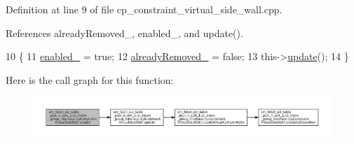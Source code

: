 Definition at line 9 of file cp\+\_\+constraint\+\_\+virtual\+\_\+side\+\_\+wall.\+cpp.



References already\+Removed\+\_\+, enabled\+\_\+, and update().


\begin{DoxyCode}
10         \{
11             \hyperlink{classsm__fetch__six__table__pick__n__sort__1_1_1cl__move__group__interface_1_1CpConstraintVirtualSideWall_a9018eb6e7d9b369e39ad70315192ab92}{enabled\_} = \textcolor{keyword}{true};
12             \hyperlink{classsm__fetch__six__table__pick__n__sort__1_1_1cl__move__group__interface_1_1CpConstraintVirtualSideWall_a951469ee4d4da92580c5a9604800a2ce}{alreadyRemoved\_} = \textcolor{keyword}{false};
13             this->\hyperlink{classsm__fetch__six__table__pick__n__sort__1_1_1cl__move__group__interface_1_1CpConstraintVirtualSideWall_a7631ce0dba22a59484ad96eb0f5482d5}{update}();
14         \}
\end{DoxyCode}
Here is the call graph for this function\+:
\nopagebreak
\begin{figure}[H]
\begin{center}
\leavevmode
\includegraphics[width=350pt]{classsm__fetch__six__table__pick__n__sort__1_1_1cl__move__group__interface_1_1CpConstraintVirtualSideWall_acc0a42d9c29ee650e7d176011afce1df_cgraph}
\end{center}
\end{figure}
\mbox{\label{classsm__fetch__six__table__pick__n__sort__1_1_1cl__move__group__interface_1_1CpConstraintVirtualSideWall_a409f2624001978e120faa2f79d7e150e}} 
